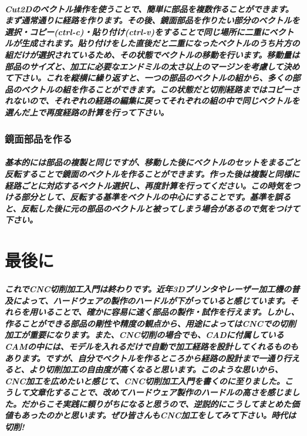 \documentclass[b5paper, 9pt, twocolumn, titlepage,openany]{jsbook}%
\begin{document}
\paragraph{Cut2Dのベクトル操作を使うことで、簡単に部品を複数作ることができます。まず通常通りに経路を作ります。その後、鏡面部品を作りたい部分のベクトルを選択・コピー(ctrl-c)・貼り付け(ctrl-v)をすることで同じ場所に二重にベクトルが生成されます。貼り付けをした直後だと二重になったベクトルのうち片方の組だけが選択されているため、その状態でベクトルの移動を行います。移動量は部品のサイズと、加工に必要なエンドミルの太さ以上のマージンを考慮して決めて下さい。これを縦横に繰り返すと、一つの部品のベクトルの組から、多くの部品のベクトルの組を作ることができます。この状態だと切削経路まではコピーされないので、それぞれの経路の編集に戻ってそれぞれの組の中で同じベクトルを選んだ上で再度経路の計算を行って下さい。}

\subsection{鏡面部品を作る}
\paragraph{基本的には部品の複製と同じですが、移動した後にベクトルのセットをまるごと反転することで鏡面のベクトルを作ることができます。作った後は複製と同様に経路ごとに対応するベクトル選択し、再度計算を行ってください。この時気をつける部分として、反転する基準をベクトルの中心にすることです。基準を誤ると、反転した後に元の部品のベクトルと被ってしまう場合があるので気をつけて下さい。}

\chapter{最後に}
\paragraph{これでCNC切削加工入門は終わりです。近年3Dプリンタやレーザー加工機の普及によって、ハードウェアの製作のハードルが下がっていると感じています。それらを用いることで、確かに容易に速く部品の製作・試作を行えます。しかし、作ることができる部品の剛性や精度の観点から、用途によってはCNCでの切削加工が重要になります。また、CNC切削の場合でも、CADに付属しているCAMの中には、モデルを入れるだけで自動で加工経路を設計してくれるものもあります。ですが、自分でベクトルを作るところから経路の設計まで一通り行えると、より切削加工の自由度が高くなると思います。このような思いから、CNC加工を広めたいと感じて、CNC切削加工入門を書くのに至りました。こうして文章化することで、改めてハードウェア製作のハードルの高さを感じました。だからこそ実践に頼りがちになると思うので、逆説的にこうしてまとめた価値もあったのかと思います。ぜひ皆さんもCNC加工をしてみて下さい。時代は切削!}






\end{document}
